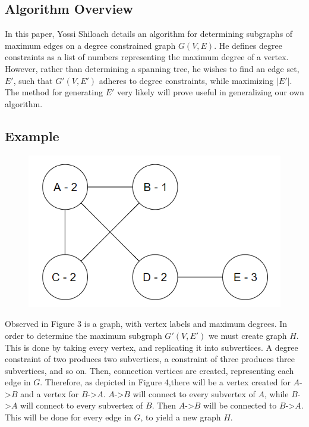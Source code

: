 \documentclass{article}
\begin{document}
	\subsection{Algorithm Overview}
	In this paper, Yossi Shiloach details an algorithm for determining subgraphs of maximum edges on a degree constrained graph $G(V,E)$. He defines
	degree constraints as a list of numbers representing the maximum degree of a vertex. However, rather than determining a spanning tree, he wishes to find an edge set, $E'$, such that $G'(V,E')$ adheres to degree constraints, while maximizing $|E'|$. The method for generating $E'$ very likely will prove useful in generalizing our own algorithm.
	\subsection{Example}
	
		\begin{figure}[H]
			\caption{}
			\includegraphics{Figure3}
		\end{figure}
	
	Observed in Figure 3 is a graph, with vertex labels and maximum degrees. In order to determine the maximum subgraph $G'(V,E')$ we must create graph $H$. This is done by taking every vertex, and replicating it into subvertices. A degree constraint of two produces two subvertices, a constraint of three produces three subvertices, and so on. Then, connection vertices are created, representing each edge in $G$. Therefore, as depicted in Figure 4,there will be a vertex created for $A$->$B$ and a vertex for $B$->$A$. $A$->$B$ will connect to every subvertex of $A$, while  $B$->$A$ will connect to every subvertex of $B$. Then $A$->$B$ will be connected to  $B$->$A$. This will be done for every edge in $G$, to yield a new graph $H$.
	
\end{document}
